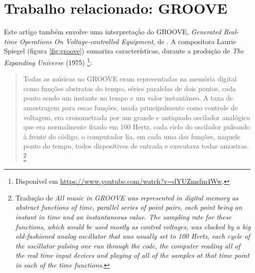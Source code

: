 \section{Trabalho relacionado: GROOVE}

Este artigo também  envolve uma interpretação do GROOVE, \emph{Generated Real-time Operations On Voltage-controlled Equipment}, de \cite{mathews_groove_1970}. A compositora Laurie Spiegel (figura \ref{fig:groove}) sumariza características, durante a produção de \emph{The Expanding Universe} (1975) \footnote{Disponível em \url{https://www.youtube.com/watch?v=dYUZmsfm4Ww}.}:

\begin{quote}
\small{Todas as músicas no GROOVE eram representadas na memória digital como funções abstratas do tempo, séries paralelas de dois pontos, cada ponto sendo um instante no tempo e um valor instantâneo. A taxa de amostragem para essas funções, usada principalmente como controle de voltagem, era cronometrada por um grande e antiquado oscilador analógico que era normalmente fixado em 100 Hertz, cada ciclo do oscilador pulsando à frente do código, o computador lia, em cada uma das funções, naquele ponto do tempo, todos dispositivos de entrada e executava todas amostras.} \footnote{Tradução de \emph{All music in GROOVE was represented in digital memory as abstract functions of time, parallel series of point pairs, each point being an instant in time and an instantaneous value. The sampling rate for these functions, which would be used mostly as control voltages, was clocked by a big old-fashioned analog oscillator that was usually set to 100 Hertz, each cycle of the oscillator pulsing one run through the code, the computer reading all of the real time input devices and playing of all of the samples at that time point in each of the time functions.}}
\end{quote}

